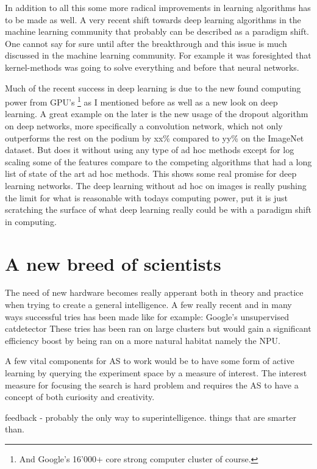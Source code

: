\documentclass{article}
\begin{document}
    In addition to all this some more radical improvements in learning
    algorithms has to be made as well. A very recent shift towards deep
    learning algorithms in the machine learning community that probably can be
    described as a paradigm shift. One cannot say for sure until after the
    breakthrough and this issue is much discussed in the machine learning
    community. For example it was foresighted that kernel-methods was going to
    solve everything and before that neural networks.
   
    Much of the recent success in deep learning is due to the new found 
    computing power from GPU's
    \footnote{And Google's 16'000+ core strong computer cluster of course.} 
    as I mentioned before as well as a new look on deep learning. A great 
    example on the later is the new usage of the dropout algorithm on deep 
    networks, more specifically a convolution network, which not only 
    outperforms the rest on the podium by xx\% compared to yy\% on the ImageNet 
    dataset.\cite{imagenet}
    But does it without using any type of ad hoc methods except for log scaling 
    some of the features compare to the competing algorithms that had a long 
    list of state of the art ad hoc methods.\cite{dropout} This shows some real 
    promise for deep learning networks. The deep learning without ad hoc on
    images is really pushing the limit for what is reasonable with todays
    computing power, put it is just scratching the surface of what deep
    learning really could be with a paradigm shift in computing.

\section{A new breed of scientists}
    The need of new hardware becomes really apperant both in
    theory and practice when trying to create a general intelligence.
    A few really recent and in many ways successful tries has been made
    like for example: Google's unsupervised catdetector %
    These tries has been ran on large clusters but would gain a
    significant efficiency boost by being ran on a more natural habitat namely 
    the NPU. 


    A few vital components for AS to work would be to 
    have some form of active learning by querying the experiment space by a 
    measure of interest. The interest measure for focusing the search is hard 
    problem and requires the AS to have a concept of both curiosity and 
    creativity.\cite{curiosity}


    feedback - probably the only way to superintelligence. things that are
    smarter than.


    
    
\end{document}
